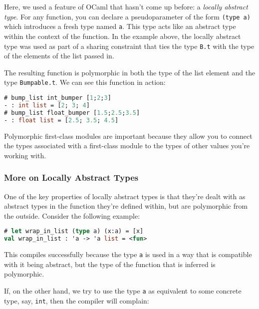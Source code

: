 Here, we used a feature of OCaml that hasn't come up before: a
\emph{locally abstract type}. For any function, you can declare a
pseudoparameter of the form \passthrough{\lstinline!(type a)!} which
introduces a fresh type named \passthrough{\lstinline!a!}. This type
acts like an abstract type within the context of the function. In the
example above, the locally abstract type was used as part of a sharing
constraint that ties the type \passthrough{\lstinline!B.t!} with the
type of the elements of the list passed in.

The resulting function is polymorphic in both the type of the list
element and the type \passthrough{\lstinline!Bumpable.t!}. We can see
this function in action:

\begin{lstlisting}[language=Caml]
# bump_list int_bumper [1;2;3]
- : int list = [2; 3; 4]
# bump_list float_bumper [1.5;2.5;3.5]
- : float list = [2.5; 3.5; 4.5]
\end{lstlisting}

Polymorphic first-class modules are important because they allow you to
connect the types associated with a first-class module to the types of
other values you're working with.

\hypertarget{more-on-locally-abstract-types}{%
\subsubsection{More on Locally Abstract
Types}\label{more-on-locally-abstract-types}}

One of the key properties of locally abstract types is that they're
dealt with as abstract types in the function they're defined within, but
are polymorphic from the outside. Consider the following example:

\begin{lstlisting}[language=Caml]
# let wrap_in_list (type a) (x:a) = [x]
val wrap_in_list : 'a -> 'a list = <fun>
\end{lstlisting}

This compiles successfully because the type \passthrough{\lstinline!a!}
is used in a way that is compatible with it being abstract, but the type
of the function that is inferred is polymorphic.

If, on the other hand, we try to use the type
\passthrough{\lstinline!a!} as equivalent to some concrete type, say,
\passthrough{\lstinline!int!}, then the compiler will complain:

